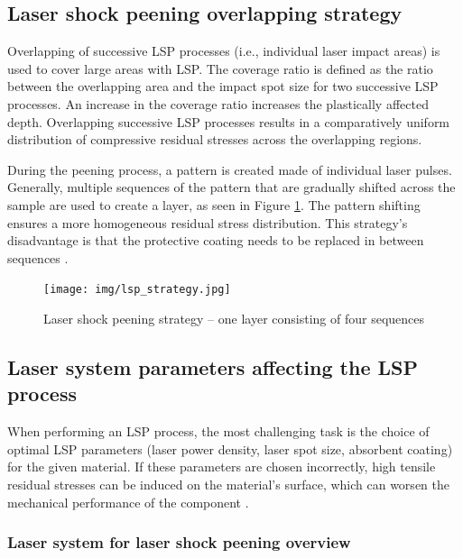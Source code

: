 \subsection{Laser shock peening overlapping strategy}

Overlapping of successive LSP processes (i.e., individual laser impact areas) is used to cover large areas with LSP. The coverage ratio is defined as the ratio between the overlapping area and the impact spot size for two successive LSP processes. An increase in the coverage ratio increases the plastically affected depth. Overlapping successive LSP processes results in a comparatively uniform distribution of compressive residual stresses across the overlapping regions.

During the peening process, a pattern is created made of individual laser pulses. Generally, multiple sequences of the pattern that are gradually shifted across the sample are used to create a layer, as seen in Figure \ref{fig:lspstrategy}. The pattern shifting ensures a more homogeneous residual stress distribution. This strategy's disadvantage is that the protective coating needs to be replaced in between sequences \cite{kaufman}.

\begin{figure}[h]
    \centering
    \texttt{[image: img/lsp\_strategy.jpg]}
    \caption{Laser shock peening strategy -- one layer consisting of four sequences \cite{bohm_kaufman_brajer_rostohar_2019}}
    \label{fig:lspstrategy}
\end{figure}



\subsection{Laser system parameters affecting the LSP process}

When performing an LSP process, the most challenging task is the choice of optimal LSP parameters (laser power density, laser spot size, absorbent coating) for the given material. If these parameters are chosen incorrectly, high tensile residual stresses can be induced on the material's surface, which can worsen the mechanical performance of the component \cite{clauer_holbrook_fairand_1981}.  

\subsubsection*{Laser system for laser shock peening overview}

